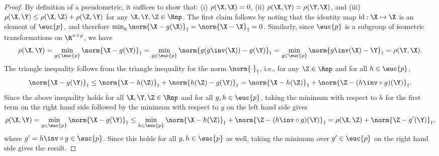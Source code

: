 \documentclass[10pt]{article}
\begin{document}
\begin{proof}
    By definition of a pseudometric, it suffices to show that: (i) $\rho(\X, \X) = 0$, (ii) $\rho(\X, \Y) = \rho(\Y, \X)$, and (iii) $\rho(\X, \Y) \le \rho(\X, \Z) + \rho(\Z, \Y)$ for any $\X, \Y, \Z \in \Rnp$. The first claim follows by noting that the identity map $\text{id}: \X \mapsto \X$ is an element of $\euc{p}$, and therefore $\min_{g}\norm{\X - g(\X)}_\dagger = \norm{\X - \X}_\dagger = 0$. Similarly, since $\euc{p}$ is a subgroup of isometric transformations on $\R^{n \times p}$, we have
    \begin{align}
        \rho(\X, \Y) = \min_{g \in \euc{p}}\norm{\X - g(\Y)}_{\dagger} = \min_{g \in \euc{p}}\norm{g(g\inv(\X)) - g(\Y)}_{\dagger} = \min_{g \in \euc{p}}\norm{g\inv(\X) - \Y}_{\dagger} = \rho(\Y, \X).
    \end{align}
    The triangle inequality follows from the triangle inequality for the norm $\norm{\cdot}_\dagger$, i.e., for any $\Z \in \Rnp$ and for all $h \in \euc{p}$,
    \begin{align}
        \norm{\X - g(\Y)}_{\dagger} \le \norm{\X - h(\Z)}_{\dagger} + \norm{h(\Z) - g(\Y)}_{\dagger} = \norm{\X - h(\Z)}_{\dagger} + \norm{\Z - (h\inv \circ g)(\Y)}_{\dagger}.
    \end{align}
    Since the above inequality holds for all $\X, \Y, \Z \in \Rnp$ and for all $g, h \in \euc{p}$, taking the minimum with respect to $h$ for the first term on the right hand side followed by the minimum with respect to $g$ on the left hand side gives
    \begin{align}
        \rho(\X, \Y) = \min_{g \in \euc{p}}\norm{\X - g(\Y)}_{\dagger} \le \min_{h \in \euc{p}}\norm{\X - h(\Z)}_{\dagger} + \norm{\Z - (h\inv \circ g)(\Y)}_{\dagger} = \rho(\X, \Z) + \norm{\Z - g'(\Y)}_{\dagger},
    \end{align}
    where $g' = h\inv \circ g \in \euc{p}$. Since this holds for all $g, h \in \euc{p}$ as well, taking the minimum over $g' \in \euc{p}$ on the right hand side gives the result.
\end{proof}
\end{document}
